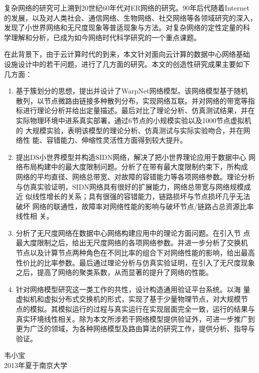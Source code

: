 \documentclass[phd,nobackinfo]{scutthesis}
\begin{document}
\begin{preface}
复杂网络的研究可上溯到20世纪60年代对ER网络的研究。90年后代随着Internet
的发展，以及对人类社会、通信网络、生物网络、社交网络等各领域研究的深入，
发现了小世界网络和无尺度现象等普适现象与方法。对复杂网络的定性定量的科
学理解和分析，已成为如今网络时代科学研究的一个重点课题。

在此背景下，由于云计算时代的到来，本文针对面向云计算的数据中心网络基础
设施设计中的若干问题，进行了几方面的研究。本文的创造性研究成果主要如下
几方面：

\begin{enumerate}
\item 基于簇划分的思想，提出并设计了WarpNet网络模型。该网络模型基于随机
  散列，以节点微路由链接多种散列分布，实现网络互联。并对网络的带宽等指
  标进行理论分析并给出定量描述。最后对比了理论分析、仿真测试结果，并在
  实际物理环境中进系真实部署，通过6节点的小规模实验以及1000节点虚拟机的
  大规模实验，表明该模型的理论分析、仿真测试与实际实验吻合，并在网络性
  能、容错能力、伸缩性灵活性方面得到较大提升。
\item 提出DS小世界模型并构造SIDN网络，解决了把小世界理论应用于数据中心
  网络布局构建中的最大度限制问题。分析了在带有最大度限制约束下，所构成
  网络的平均直径、网络总带宽、对故障的容错能力等各项网络参数。理论分析
  与仿真实验证明，SIDN网络具有很好的扩展能力，网络总带宽与网络规模成近
  似线性增长的关系；具有很强的容错能力，链路损坏与节点损坏几乎无法破坏
  网络的联通性，故障率对网络性能的影响与破坏节点/链路占总资源比率线性相
  关。
\item 分析了无尺度网络在数据中心网络构建应用中的理论方面问题。在引入节
  点最大度限制之后，给出无尺度网络的各项网络参数。并进一步分析了交换机
  节点以及计算节点两种角色在不同比率的组合下对网络性能的影响，给出最高
  性价比的比率参数。最后通过理论分析与仿真实验证明，在引入了无尺度现象
  之后，提高了网络的聚类系数，从而显著的提升了网络的性能。

\item 针对网络模型研究这一类工作的共性，设计构造通用验证平台系统。以海
  量虚拟机和虚拟分布式交换机的形式，实现了基于少量物理节点，对大规模节
  点的模拟。其模拟运行的过程与真实运行在实现层面完全一致，运行的结果与
  真实环境线性相关。除为本文所涉若干网络模型提供验证外，可进一步推广到
  更为广泛的领域，为各种网络模型及路由算法的研究工作，提供分析、指导与
  验证。
\end{enumerate}

\vspace{1cm}
\begin{flushright}
韦小宝\\
2013年夏于南京大学
\end{flushright}

\end{preface}
\end{document}
